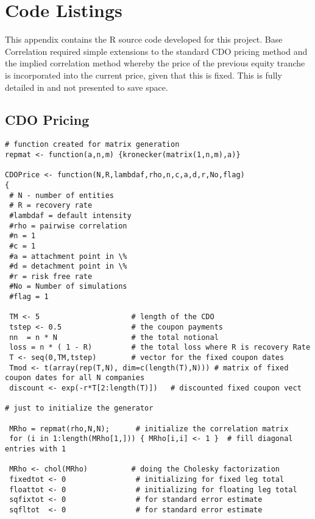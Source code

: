 \chapter{Code Listings}\label{app:code}

This appendix contains the R source code developed for this project. 
Base Correlation required simple extensions to the standard CDO pricing method
and the implied correlation method whereby the price of the previous equity tranche
is incorporated into the current price, given that this is fixed. This is fully detailed in \cite{KL2004} and not
presented to save space.

\section{CDO Pricing}\label{sec:cdo_price}
\begin{singlespace}

\begin{lstlisting}
# function created for matrix generation
repmat <- function(a,n,m) {kronecker(matrix(1,n,m),a)}

CDOPrice <- function(N,R,lambdaf,rho,n,c,a,d,r,No,flag)  
{  
 # N - number of entities
 # R = recovery rate
 #lambdaf = default intensity
 #rho = pairwise correlation
 #n = 1
 #c = 1
 #a = attachment point in \%
 #d = detachment point in \%
 #r = risk free rate
 #No = Number of simulations
 #flag = 1

 TM <- 5                     # length of the CDO     
 tstep <- 0.5                # the coupon payments     
 nn  = n * N                 # the total notional     
 loss = n * ( 1 - R)         # the total loss where R is recovery Rate
 T <- seq(0,TM,tstep)        # vector for the fixed coupon dates     
 Tmod <- t(array(rep(T,N), dim=c(length(T),N))) # matrix of fixed coupon dates for all N companies     
 discount <- exp(-r*T[2:length(T)])   # discounted fixed coupon vect

# just to initialize the generator     

 MRho = repmat(rho,N,N);      # initialize the correlation matrix     
 for (i in 1:length(MRho[1,])) { MRho[i,i] <- 1 }  # fill diagonal entries with 1      
     
 MRho <- chol(MRho)          # doing the Cholesky factorization     
 fixedtot <- 0                # initializing for fixed leg total     
 floattot <- 0                # initializing for floating leg total     
 sqfixtot <- 0                # for standard error estimate     
 sqfltot  <- 0                # for standard error estimate   


\end{lstlisting}
\end{singlespace}

